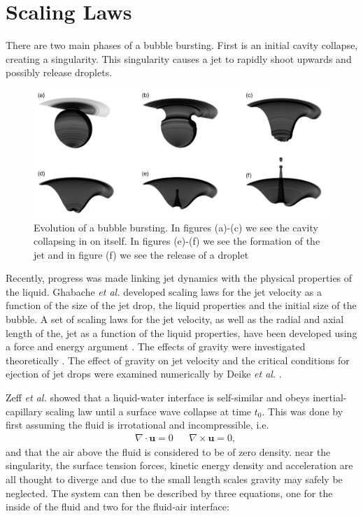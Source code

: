 \section{Scaling Laws}

There are two main phases of a bubble bursting. First is an initial cavity collapse, creating a singularity. This singularity causes a jet to rapidly shoot upwards and possibly release droplets.

\begin{figure}[!h]
    \centering
    \includegraphics[width=0.8\linewidth]{WriteUp/images/many 3D profiles.png}
    \caption{Evolution of a bubble bursting. In figures (a)-(c) we see the cavity collapsing in on itself. In figures (e)-(f) we see the formation of the jet and in figure (f) we see the release of a droplet}
    \label{fig:Profiles}
\end{figure}

Recently, progress was made linking jet dynamics with the physical properties of the liquid. Ghabache \textit{et al.} \cite{ghabache2014physics} developed scaling laws for the jet velocity as a function of the size of the jet drop, the liquid properties and the initial size of the bubble. A set of scaling laws
for the jet velocity, as well as the radial and axial length of
the, jet as a function of the liquid properties, have been
developed using a force and energy argument \cite{ganan2017revision}. The
effects of gravity were investigated theoretically \cite{ganan2018scaling}. The
effect of gravity on jet velocity and the critical conditions
for ejection of jet drops were examined numerically by
Deike \textit{et al.} \cite{deike2018dynamics}.

Zeff \textit{et al.} \cite{zeff2000singularity} showed that a liquid-water interface is self-similar
and obeys inertial-capillary scaling law until a surface wave collapse at time $t_0$. This was done by first assuming the fluid is irrotational and incompressible, i.e.
\begin{align}
    &\nabla \cdot \textbf{u}=0&&\nabla \times \textbf{u}=0,
\end{align}
and that the air above the fluid is considered to be of zero density. near the singularity, the surface tension forces, kinetic energy density and acceleration are all thought to diverge and due to the small length scales gravity may safely be neglected. The system can then be described by three equations, one for the inside of the fluid and two for the fluid-air interface:

